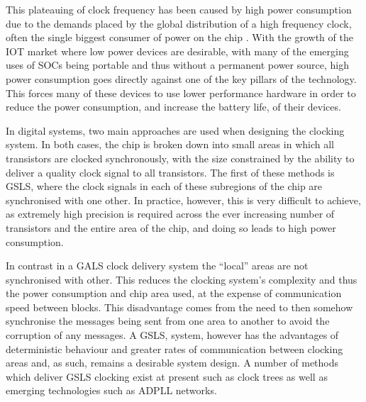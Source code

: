 This plateauing of clock frequency has been caused by high power consumption due to the demands placed by the global distribution of a high frequency clock, often the single biggest consumer of power on the chip \cite{tiwari1998reducing}.
With the growth of the \ac{IOT} market where low power devices are desirable, with many of the emerging uses of \ac{SOC}s being portable and thus without a permanent power source, high power consumption goes directly against one of the key pillars of the technology. This forces many of these devices to use lower performance hardware in order to reduce the power consumption, and increase the battery life, of their devices.

In digital systems, two main approaches are used when designing the clocking system. In both cases, the chip is broken down into small areas in which all transistors are clocked synchronously, with the size constrained by the ability to deliver a quality clock signal to all transistors. The first of these methods is \ac{GSLS}, where the clock signals in each of these subregions of the chip are synchronised with one other. In practice, however, this is very difficult to achieve, as extremely high precision is required across the ever increasing number of transistors and the entire area of the chip, and doing so leads to high power consumption.

In contrast in a \ac{GALS} clock delivery system the ``local'' areas are not synchronised with other. This reduces the clocking system's complexity and thus the power consumption and chip area used, at the expense of communication speed between blocks. This disadvantage comes from the need to then somehow synchronise the messages being sent from one area to another to avoid the corruption of any messages.
A \ac{GSLS}, system, however has the advantages of deterministic behaviour and greater rates of communication between clocking areas and, as such, remains a desirable system design. A number of methods which deliver \ac{GSLS} clocking exist at present such as clock trees as well as emerging technologies such as ADPLL networks.

